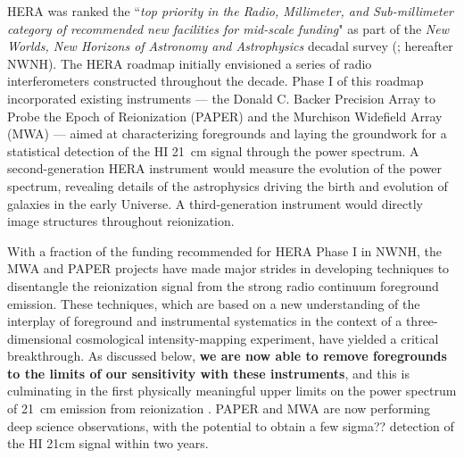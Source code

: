 \documentclass[preprint]{aastex}
\begin{document}
HERA was ranked the ``{\it top priority in the Radio, Millimeter, and
Sub-millimeter category of recommended new facilities for mid-scale
funding}" as part of the {\it New Worlds, New Horizons of Astronomy
and Astrophysics} decadal survey (\citealt{astro2010}; hereafter
NWNH).  The HERA roadmap initially envisioned a series of radio
interferometers constructed throughout the decade. Phase I of this roadmap
incorporated existing instruments --- the Donald C. Backer Precision Array to Probe the Epoch of
Reionization (PAPER) and the Murchison Widefield Array (MWA) ---
aimed at characterizing foregrounds and laying the
groundwork for a statistical detection of the HI 21~cm signal through
the power spectrum.  A second-generation HERA instrument would measure
the evolution of the power spectrum, revealing details of the astrophysics driving
the birth and evolution of galaxies 
in the early Universe. A third-generation instrument would
directly image structures throughout reionization.

With a fraction of the funding recommended for HERA Phase I
in NWNH, the MWA and PAPER projects have made
major strides in developing techniques to disentangle
the reionization signal from the strong radio continuum foreground
emission.  These techniques, which are based on a new
understanding of the interplay of foreground and instrumental systematics
in the context of a three-dimensional cosmological intensity-mapping experiment,
have yielded a critical breakthrough.  As discussed below, {\bf we are now able to remove 
foregrounds to the limits of our sensitivity with these instruments},
and this is culminating in the first physically meaningful upper limits
on the power spectrum of 21~cm emission from reionization \citep{parsons_et_al2013}. PAPER
and MWA are now performing deep science observations, with the potential to 
obtain a few sigma?? detection of the HI 21cm signal within two years. 


\end{document}
